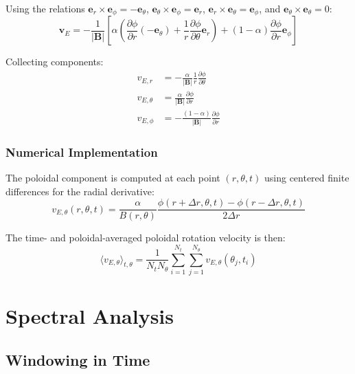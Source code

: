 \documentclass[11pt,a4paper]{article}
\begin{document}
Using the relations $\mathbf{e}_r \times \mathbf{e}_\phi = -\mathbf{e}_\theta$, $\mathbf{e}_\theta \times \mathbf{e}_\phi = \mathbf{e}_r$, $\mathbf{e}_r \times \mathbf{e}_\theta = \mathbf{e}_\phi$, and $\mathbf{e}_\theta \times \mathbf{e}_\theta = 0$:
\begin{equation}
\mathbf{v}_E = -\frac{1}{|\mathbf{B}|} \left[ \alpha \left( \frac{\partial \phi}{\partial r} (-\mathbf{e}_\theta) + \frac{1}{r} \frac{\partial \phi}{\partial \theta} \mathbf{e}_r \right) + (1 - \alpha) \frac{\partial \phi}{\partial r} \mathbf{e}_\phi \right]
\end{equation}

Collecting components:
\begin{align}
v_{E,r} &= -\frac{\alpha}{|\mathbf{B}|} \frac{1}{r} \frac{\partial \phi}{\partial \theta} \\
v_{E,\theta} &= \frac{\alpha}{|\mathbf{B}|} \frac{\partial \phi}{\partial r} \\
v_{E,\phi} &= -\frac{(1 - \alpha)}{|\mathbf{B}|} \frac{\partial \phi}{\partial r}
\end{align}

\subsubsection{Numerical Implementation}

The poloidal component is computed at each point $(r, \theta, t)$ using centered finite differences for the radial derivative:
\begin{equation}
v_{E,\theta}(r, \theta, t) = \frac{\alpha}{B(r,\theta)} \frac{\phi(r + \Delta r, \theta, t) - \phi(r - \Delta r, \theta, t)}{2 \Delta r}
\end{equation}

The time- and poloidal-averaged poloidal rotation velocity is then:
\begin{equation}
\langle v_{E,\theta} \rangle_{t,\theta} = \frac{1}{N_t N_\theta} \sum_{i=1}^{N_t} \sum_{j=1}^{N_\theta} v_{E,\theta}(\theta_j, t_i)
\end{equation}

\section{Spectral Analysis}

\subsection{Windowing in Time}
\end{document}
